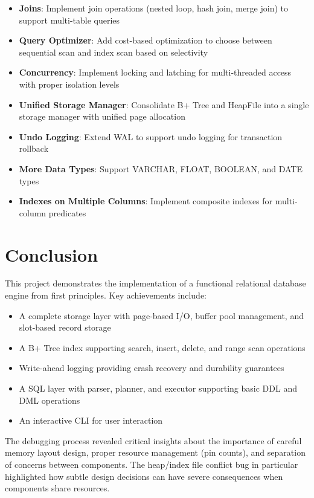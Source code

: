 \documentclass{article}
\begin{document}
\begin{itemize}
    \item \textbf{Joins}: Implement join operations (nested loop, hash join, merge join) to support multi-table queries
    \item \textbf{Query Optimizer}: Add cost-based optimization to choose between sequential scan and index scan based on selectivity
    \item \textbf{Concurrency}: Implement locking and latching for multi-threaded access with proper isolation levels
    \item \textbf{Unified Storage Manager}: Consolidate B+ Tree and HeapFile into a single storage manager with unified page allocation
    \item \textbf{Undo Logging}: Extend WAL to support undo logging for transaction rollback
    \item \textbf{More Data Types}: Support VARCHAR, FLOAT, BOOLEAN, and DATE types
    \item \textbf{Indexes on Multiple Columns}: Implement composite indexes for multi-column predicates
\end{itemize}

\section{Conclusion}

This project demonstrates the implementation of a functional relational database engine from first principles. Key achievements include:

\begin{itemize}
    \item A complete storage layer with page-based I/O, buffer pool management, and slot-based record storage
    \item A B+ Tree index supporting search, insert, delete, and range scan operations
    \item Write-ahead logging providing crash recovery and durability guarantees
    \item A SQL layer with parser, planner, and executor supporting basic DDL and DML operations
    \item An interactive CLI for user interaction
\end{itemize}

The debugging process revealed critical insights about the importance of careful memory layout design, proper resource management (pin counts), and separation of concerns between components. The heap/index file conflict bug in particular highlighted how subtle design decisions can have severe consequences when components share resources.
\end{document}
